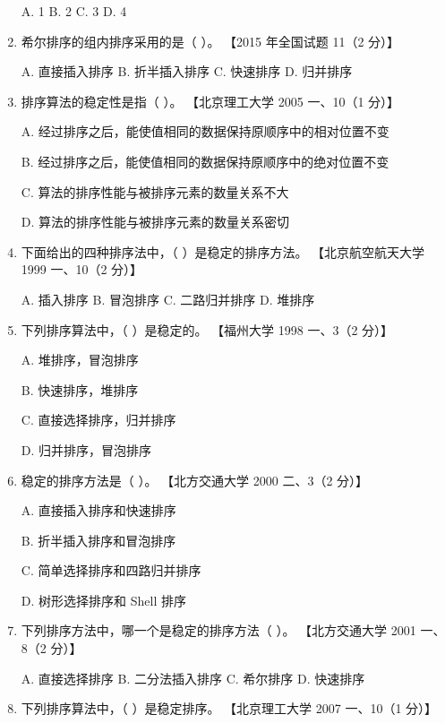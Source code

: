 \documentclass[lang=cn,newtx,10pt,scheme=chinese]{elegantbook}
\begin{document}
\begin{enumerate}
    A. 1 \quad B. 2 \quad C. 3 \quad D. 4  

    \item 希尔排序的组内排序采用的是（ ）。  
    【2015 年全国试题 11（2 分）】 

    A. 直接插入排序 \quad B. 折半插入排序 \quad C. 快速排序 \quad D. 归并排序  

    \item 排序算法的稳定性是指（ ）。  
    【北京理工大学 2005 一、10（1 分）】  

    A. 经过排序之后，能使值相同的数据保持原顺序中的相对位置不变  

    B. 经过排序之后，能使值相同的数据保持原顺序中的绝对位置不变  

    C. 算法的排序性能与被排序元素的数量关系不大  

    D. 算法的排序性能与被排序元素的数量关系密切  

    \item 下面给出的四种排序法中，（ ）是稳定的排序方法。  
    【北京航空航天大学 1999 一、10（2 分）】 

    A. 插入排序 \quad B. 冒泡排序 \quad C. 二路归并排序 \quad D. 堆排序  

    \item 下列排序算法中，（ ）是稳定的。  
    【福州大学 1998 一、3（2 分）】  

    A. 堆排序，冒泡排序  

    B. 快速排序，堆排序  

    C. 直接选择排序，归并排序  

    D. 归并排序，冒泡排序  

    \item 稳定的排序方法是（ ）。  
    【北方交通大学 2000 二、3（2 分）】  

    A. 直接插入排序和快速排序  

    B. 折半插入排序和冒泡排序  

    C. 简单选择排序和四路归并排序  

    D. 树形选择排序和 Shell 排序  

    \item 下列排序方法中，哪一个是稳定的排序方法（ ）。  
    【北方交通大学 2001 一、8（2 分）】  

    A. 直接选择排序 \quad B. 二分法插入排序 \quad C. 希尔排序 \quad D. 快速排序  

    \item 下列排序算法中，（ ）是稳定排序。  
    【北京理工大学 2007 一、10（1 分）】  


\end{enumerate}
\end{document}
